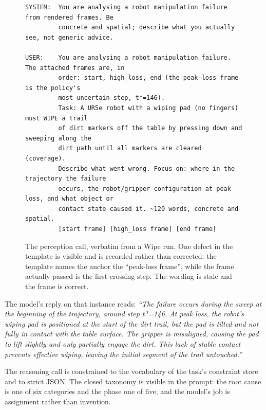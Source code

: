 \documentclass[letterpaper]{article}
\begin{document}
\begin{figure}[t]
\centering
\begin{minipage}{\textwidth}
\begin{verbatim}
SYSTEM:  You are analysing a robot manipulation failure from rendered frames. Be
         concrete and spatial; describe what you actually see, not generic advice.

USER:    You are analysing a robot manipulation failure. The attached frames are, in
         order: start, high_loss, end (the peak-loss frame is the policy's
         most-uncertain step, t*=146).
         Task: A UR5e robot with a wiping pad (no fingers) must WIPE a trail
         of dirt markers off the table by pressing down and sweeping along the
         dirt path until all markers are cleared (coverage).
         Describe what went wrong. Focus on: where in the trajectory the failure
         occurs, the robot/gripper configuration at peak loss, and what object or
         contact state caused it. ~120 words, concrete and spatial.
         [start frame] [high_loss frame] [end frame]
\end{verbatim}
\end{minipage}
\caption{The perception call, verbatim from a Wipe run. One defect in the template is
visible and is recorded rather than corrected: the template names the anchor the
``peak-loss frame'', while the frame actually passed is the first-crossing step. The
wording is stale and the frame is correct.}
\label{fig:prompt-vlm}
\end{figure}

The model's reply on that instance reads: \emph{``The failure occurs during the sweep at
the beginning of the trajectory, around step t*=146. At peak loss, the robot's wiping
pad is positioned at the start of the dirt trail, but the pad is tilted and not fully in
contact with the table surface. The gripper is misaligned, causing the pad to lift
slightly and only partially engage the dirt. This lack of stable contact prevents
effective wiping, leaving the initial segment of the trail untouched.''}

The reasoning call is constrained to the vocabulary of the task's constraint store and
to strict JSON. The closed taxonomy is visible in the prompt: the root cause is one of
six categories and the phase one of five, and the model's job is assignment rather than
invention.
\end{document}
